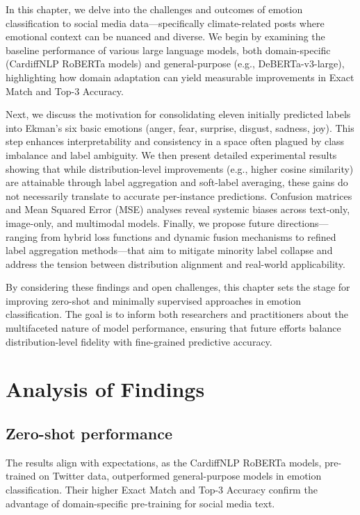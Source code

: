 In this chapter, we delve into the challenges and outcomes of emotion classification to social media data—specifically climate-related posts where emotional context can be nuanced and diverse. We begin by examining the baseline performance of various large language models, both domain-specific (CardiffNLP RoBERTa models) and general-purpose (e.g., DeBERTa-v3-large), highlighting how domain adaptation can yield measurable improvements in Exact Match and Top-3 Accuracy.

Next, we discuss the motivation for consolidating eleven initially predicted labels into Ekman’s six basic emotions (anger, fear, surprise, disgust, sadness, joy). This step enhances interpretability and consistency in a space often plagued by class imbalance and label ambiguity. We then present detailed experimental results showing that while distribution-level improvements (e.g., higher cosine similarity) are attainable through label aggregation and soft-label averaging, these gains do not necessarily translate to accurate per-instance predictions. Confusion matrices and Mean Squared Error (MSE) analyses reveal systemic biases across text-only, image-only, and multimodal models. Finally, we propose future directions—ranging from hybrid loss functions and dynamic fusion mechanisms to refined label aggregation methods—that aim to mitigate minority label collapse and address the tension between distribution alignment and real-world applicability.

By considering these findings and open challenges, this chapter sets the stage for improving zero-shot and minimally supervised approaches in emotion classification. The goal is to inform both researchers and practitioners about the multifaceted nature of model performance, ensuring that future efforts balance distribution-level fidelity with fine-grained predictive accuracy.

\section{Analysis of Findings}
\subsection{Zero-shot performance}

The results align with expectations, as the CardiffNLP RoBERTa models, pre-trained on Twitter data, outperformed general-purpose models in emotion classification. Their higher Exact Match and Top-3 Accuracy confirm the advantage of domain-specific pre-training for social media text.
\newline


